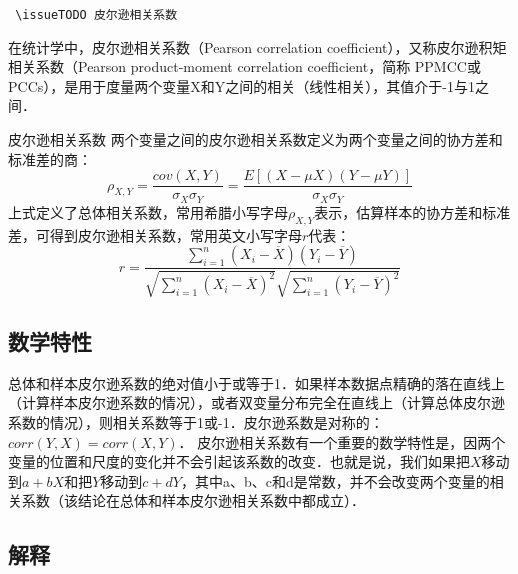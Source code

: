 
\verb | \issueTODO 皮尔逊相关系数|

在统计学中，皮尔逊相关系数（Pearson correlation coefficient），又称皮尔逊积矩相关系数（Pearson product-moment correlation coefficient，简称 PPMCC或PCCs），是用于度量两个变量X和Y之间的相关（线性相关），其值介于-1与1之间．
\begin{definition}{皮尔逊相关系数}\label{PearsR_def1}
两个变量之间的皮尔逊相关系数定义为两个变量之间的协方差和标准差的商：
\begin{equation}
\rho_{X,Y}=\frac{cov(X,Y)}{\sigma_{X}\sigma_{Y}}=\frac{E[(X-\mu X)(Y-\mu Y)]}{\sigma_{X}\sigma_{Y}}
\end{equation}
上式定义了总体相关系数，常用希腊小写字母$\rho_{X,Y}$表示，估算样本的协方差和标准差，可得到皮尔逊相关系数，常用英文小写字母$r$代表：
\begin{equation}
r=\frac{\sum_{i=1}^n\left(X_i-\overline X\right)\left(Y_i-\overline Y\right)}{\sqrt{\sum_{i=1}^n\left(X_i-\overline X\right)^2}\sqrt{\sum_{i=1}^n\left(Y_i-\overline Y\right)^2}}
\end{equation}
\end{definition}
\subsection{数学特性}
总体和样本皮尔逊系数的绝对值小于或等于1．如果样本数据点精确的落在直线上（计算样本皮尔逊系数的情况），或者双变量分布完全在直线上（计算总体皮尔逊系数的情况），则相关系数等于1或-1．皮尔逊系数是对称的： $corr(Y,X)=corr(X,Y)$．
皮尔逊相关系数有一个重要的数学特性是，因两个变量的位置和尺度的变化并不会引起该系数的改变．也就是说，我们如果把$X$移动到$a+bX$和把$Y$移动到$c+dY$，其中a、b、c和d是常数，并不会改变两个变量的相关系数（该结论在总体和样本皮尔逊相关系数中都成立）．
\subsection{解释}
